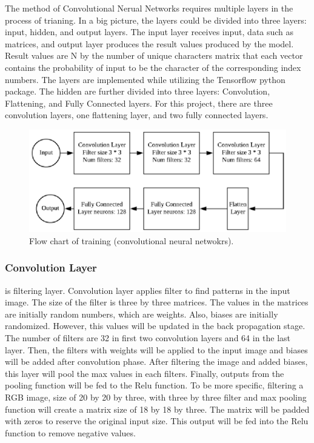 The method of Convolutional Nerual Networks requires multiple layers in the process of trianing.
In a big picture, the layers could be divided into three layers: input, hidden, and output layers.
The input layer receives input, data such as matrices, and output layer produces the result values produced
by the model. Result values are N by the number of unique characters matrix that each vector contains the
probability of input to be the character of the corresponding index numbers. The layers are implemented while
utilizing the Tensorflow python package.
\newline
\newline
\indent
The hidden are further divided into three layers: Convolution, Flattening, and Fully Connected layers.
For this project, there are three convolution layers, one flattening layer, and two fully connected layers.
    \begin{figure}
        \includegraphics[width=\textwidth, scale=0.25]{flow.eps}
        \caption{Flow chart of training (convolutional neural netwokrs).\cite{sachan_2017}} \label{Figure1}
    \end{figure}

\subsubsection{Convolution Layer} is filtering layer.
Convolution layer applies filter to find patterns in the input image. The size of the filter is three by three matrices. The values
in the matrices are initially random numbers, which are weights. Also, biases are initially randomized.
However, this values will be updated in the back propagation
stage.
\newline
\newline
\indent
The number of filters are 32 in first two convolution layers and 64 in the last layer. Then, the filters with
weights will be applied to the input image and biases will be added after convolution phase. After filtering the
image and added biases, this layer will pool the max values in each filters. Finally, outputs from the pooling
function will be fed to the Relu function.
\newline
\newline
\indent
To be more specific, filtering a RGB image, size of 20 by 20 by three, with three by three filter and max pooling
function will create a matrix size of 18 by 18 by three. The matrix will be padded with zeros to reserve the original input
size. This output will be fed into the Relu function to remove negative values.


